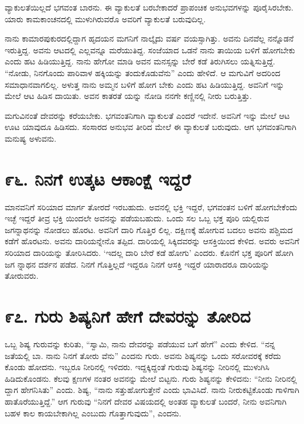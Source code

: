 ವ್ಯಾಕುಲತೆಯಿಲ್ಲದೆ ಭಗವಂತ ಬಾರನು. ಈ ವ್ಯಾಕುಲತೆ ಬರಬೇಕಾದರೆ ಪ್ರಾಪಂಚಿಕ ಅನುಭವಗಳನ್ನು ಪೂರೈಸಿರಬೇಕು. ಯಾರು ಕಾಮಕಾಂಚನದಲ್ಲಿ ಮುಳುಗಿರುವರೊ ಅವರಿಗೆ ವ್ಯಾಕುಲತೆ ಬರುವುದಿಲ್ಲ.

ನಾನು ಕಾಮಾರಪುಕುರದಲ್ಲಿದ್ದಾಗ ಹೃದಯನ ಮಗನಿಗೆ ನಾಲ್ಕೈದು ವರ್ಷ ವಯಸ್ಸಾಗಿತ್ತು. ಅವನು ದಿನವೆಲ್ಲ ನನ್ನೊಡನೆ ಇರುತ್ತಿದ್ದ. ಅವನು ಆಟದಲ್ಲಿ ಎಲ್ಲವನ್ನೂ ಮರೆಯುತಿದ್ದ. ಸಂಜೆಯಾದ ಒಡನೆ ನಾನು ತಾಯಿಯ ಬಳಿಗೆ ಹೋಗಬೇಕು ಎಂದು ಹಟ ಹಿಡಿಯುತ್ತಿದ್ದ. ನಾನು ಹೇಗೋ ಮಾಡಿ ಅವನ ಮನಸ್ಸನ್ನು ಬೇರೆ ಕಡೆ ತಿರುಗಿಸಲು ಯತ್ನಿಸುತ್ತಿದ್ದೆ. “ನೋಡು, ನಿನಗೊಂದು ಪಾರಿವಾಳ ಹಕ್ಕಿಯನ್ನು ತಂದುಕೊಡುವೆನು” ಎಂದು ಹೇಳಿದೆ. ಆ ಮಗುವಿಗೆ ಅದರಿಂದ ಸಮಾಧಾನವಾಗಲಿಲ್ಲ. ಅಳುತ್ತ ನಾನು ಅಮ್ಮನ ಬಳಿಗೆ ಹೋಗ ಬೇಕು ಎಂದು ಹಟ ಹಿಡಿಯುತ್ತಿದ್ದ. ಅವನಿಗೆ ಇನ್ನು ಮೇಲೆ ಆಟ ಹಿಡಿಸ ದಾಯಿತು. ಅವನ ಕಾತರತೆ ಯನ್ನು ನೋಡಿ ನನಗೇ ಕಣ್ಣಿನಲ್ಲಿ ನೀರು ಬರುತ್ತಿತ್ತು.

ಮಗುವಿನಂತೆ ದೇವರನ್ನು ಕರೆಯಬೇಕು. ಭಗವಂತನಿಗಾಗಿ ವ್ಯಾಕುಲತೆ ಎಂದರೆ ಇದೇನೆ. ಅವನಿಗೆ ಇನ್ನು ಮೇಲೆ ಆಟ ಊಟ ಯಾವುದೂ ಹಿಡಿಸದು. ಸಂಸಾರದ ಅನುಭವ ತೀರಿದ ಮೇಲೆ ಈ ವ್ಯಾಕುಲತೆ ಬರುವುದು. ಆಗ ಭಗವಂತನಿಗಾಗಿ ಮನುಷ್ಯ ಅಳುವನು.


\section{\num{೯೬. } ನಿನಗೆ ಉತ್ಕಟ ಆಕಾಂಕ್ಷೆ ಇದ್ದರೆ}

ಮಾನವನಿಗೆ ಸರಿಯಾದ ಮಾರ್ಗ ತೋರದೆ ಇರಬಹುದು. ಅವನಲ್ಲಿ ಭಕ್ತಿ ಇದ್ದರೆ, ಭಗವಂತನ ಬಳಿಗೆ ಹೋಗಬೇಕೆಂದು ಇಚ್ಛೆ ಇದ್ದರೆ ತೀವ್ರ ಭಕ್ತಿ ಯಿಂದಲೇ ಅವನನ್ನು ಪಡೆಯಬಹುದು. ಒಂದು ಸಲ ಒಬ್ಬ ಭಕ್ತ ಪೂರಿ ಯಲ್ಲಿರುವ ಜಗನ್ನಾಥನನ್ನು ನೋಡಲು ಹೊರಟ. ಅವನಿಗೆ ದಾರಿ ಗೊತ್ತಿರ ಲಿಲ್ಲ. ದಕ್ಷಿಣಕ್ಕೆ ಹೋಗುವ ಬದಲು ಅವನು ಪಶ್ಚಿಮದ ಕಡೆಗೆ ಹೊರಟನು. ಅವನು ದಾರಿಯನ್ನೇನೊ ತಪ್ಪಿದ. ದಾರಿಯಲ್ಲಿ ಸಿಕ್ಕಿದವರನ್ನು ಆಸಕ್ತಿಯಿಂದ ಕೇಳಿದ. ಅವರು ಅವನಿಗೆ ಸರಿಯಾದ ದಾರಿಯನ್ನು ತೋರಿಸಿದರು. ‘ಇದಲ್ಲ ದಾರಿ ಬೇರೆ ಕಡೆ ಹೋಗು’ ಎಂದರು. ಕೊನೆಗೆ ಭಕ್ತ ಪೂರಿಗೆ ಹೋಗಿ ಜಗ ನ್ನಾಥನ ದರ್ಶನ ಪಡೆದ. ನಿನಗೆ ಗೊತ್ತಿಲ್ಲದೆ ಇದ್ದರೂ ನಿನಗೆ ಆಸಕ್ತಿ ಇದ್ದರೆ ಯಾರಾದರೂ ದಾರಿಯನ್ನು ತೋರುವರು.


\section{\num{೯೭. } ಗುರು ಶಿಷ್ಯನಿಗೆ ಹೇಗೆ ದೇವರನ್ನು ತೋರಿದ}

ಒಬ್ಬ ಶಿಷ್ಯ ಗುರುವನ್ನು ಕುರಿತು, “ಸ್ವಾಮಿ, ನಾನು ದೇವರನ್ನು ಪಡೆಯುವ ಬಗೆ ಹೇಗೆ” ಎಂದು ಕೇಳಿದ. “ನನ್ನ ಜತೆಯಲ್ಲಿ ಬಾ. ನಾನು ನಿನಗೆ ತೋರು ವೆನು” ಎಂದನು ಗುರು. ಅವನು ಶಿಷ್ಯನನ್ನು ಒಂದು ಸರೋವರಕ್ಕೆ ಕರೆದು ಕೊಂಡು ಹೋದನು. ಇಬ್ಬರೂ ನೀರಿನಲ್ಲಿ ಇಳಿದರು. ಇದ್ದಕ್ಕಿದ್ದಂತೆ ಗುರುವು ಶಿಷ್ಯನನ್ನು ನೀರಿನಲ್ಲಿ ಮುಳುಗಿಸಿ ಹಿಡಿದುಕೊಂಡನು. ಕೆಲವು ಕ್ಷಣಗಳ ನಂತರ ಅವನನ್ನು ಮೇಲೆ ಬಿಟ್ಟನು. ಗುರು ಶಿಷ್ಯನನ್ನು ಕೇಳಿದನು: “ನೀನು ನೀರಿನಲ್ಲಿ ದ್ದಾಗ ಹೇಗನಿಸಿತು” ಎಂದು. ಶಿಷ್ಯ, “ನಾನು ಸತ್ತುಹೋಗುತ್ತೇನೆ ಎಂದು ಭಾವಿಸಿದೆ. ನಾನು ನೀರುಕಟ್ಟಿಕೊಂಡು ಗಾಳಿಗಾಗಿ ಹಾತೊರೆಯುತ್ತಿದ್ದೆ.” ಆಗ ಗುರುವು “ನಿನಗೆ ದೇವರ ವಿಷಯದಲ್ಲಿ ಅಂತಹ ವ್ಯಾಕುಲತೆ ಬಂದರೆ, ನೀನು ಅವನಿಗಾಗಿ ಬಹಳ ಕಾಲ ಕಾಯಬೇಕಾಗಿಲ್ಲ ಎಂಬುದು ಗೊತ್ತಾಗುವುದು”, ಎಂದನು.


